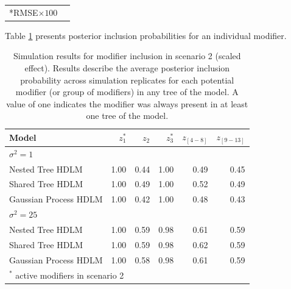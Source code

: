 \documentclass[12pt]{article}
\begin{document}
\begin{table}[!ht]
\begin{tabular}{lrrrrrrrrr}
        
        \bottomrule[2pt]
        \multicolumn{9}{l}{*RMSE$\times100$}\\
    \end{tabular}
\end{table}

Table \ref{tab:scen2_inca} presents posterior inclusion probabilities for an individual modifier.

\begin{table}[!ht]
 \scriptsize
    \centering
    \caption{Simulation results for modifier inclusion in scenario 2 (scaled effect). Results describe the average posterior inclusion probability across simulation replicates for each potential modifier (or group of modifiers) in any tree of the model. A value of one indicates the modifier was always present in at least one tree of the model.}\vspace{6pt}
    \label{tab:scen2_inca}
    \begin{tabular}{lrrrrr}
        \toprule[2pt]
        Model & $z_1^*$ & $z_2$ & $z_3^*$ & $z_{[4-8]}$ & $z_{[9-13]}$\\
        
        \midrule
        \multicolumn{6}{l}{$\sigma^2=1$}\\
Nested Tree HDLM & 1.00 & 0.44 & 1.00 & 0.49 & 0.45\\
Shared Tree HDLM & 1.00 & 0.49 & 1.00 & 0.52 & 0.49\\
Gaussian Process HDLM & 1.00 & 0.42 & 1.00 & 0.48 & 0.43\\
        

        \midrule
        \multicolumn{6}{l}{$\sigma^2=25$}\\
Nested Tree HDLM & 1.00 & 0.59 & 0.98 & 0.61 & 0.59\\
Shared Tree HDLM & 1.00 & 0.59 & 0.98 & 0.62 & 0.59\\
Gaussian Process HDLM & 1.00 & 0.58 & 0.98 & 0.61 & 0.59\\
        \bottomrule[2pt]
        \multicolumn{6}{l}{$^*$ active modifiers in scenario 2}\\
    \end{tabular}
\end{table}
\end{document}
